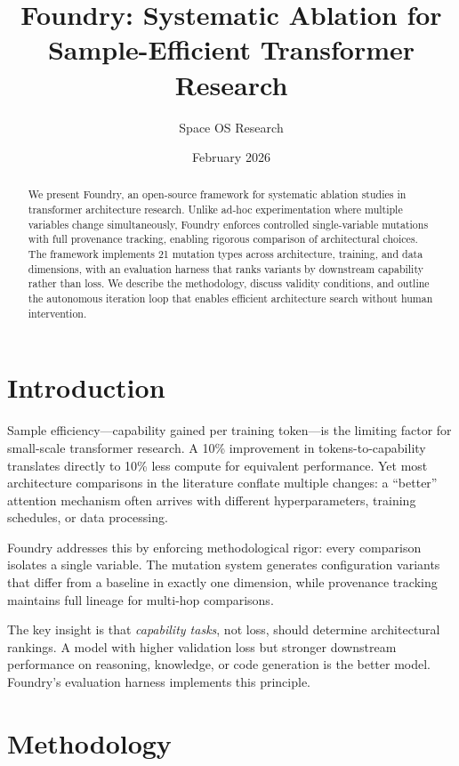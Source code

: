 \documentclass{article}
\title{Foundry: Systematic Ablation for Sample-Efficient Transformer Research}
\author{Space OS Research}
\date{February 2026}
\begin{document}
\maketitle

\begin{abstract}
We present Foundry, an open-source framework for systematic ablation studies in transformer architecture research. Unlike ad-hoc experimentation where multiple variables change simultaneously, Foundry enforces controlled single-variable mutations with full provenance tracking, enabling rigorous comparison of architectural choices. The framework implements 21 mutation types across architecture, training, and data dimensions, with an evaluation harness that ranks variants by downstream capability rather than loss. We describe the methodology, discuss validity conditions, and outline the autonomous iteration loop that enables efficient architecture search without human intervention.
\end{abstract}

\section{Introduction}

Sample efficiency---capability gained per training token---is the limiting factor for small-scale transformer research. A 10\% improvement in tokens-to-capability translates directly to 10\% less compute for equivalent performance. Yet most architecture comparisons in the literature conflate multiple changes: a ``better'' attention mechanism often arrives with different hyperparameters, training schedules, or data processing.

Foundry addresses this by enforcing methodological rigor: every comparison isolates a single variable. The mutation system generates configuration variants that differ from a baseline in exactly one dimension, while provenance tracking maintains full lineage for multi-hop comparisons.

The key insight is that \textit{capability tasks}, not loss, should determine architectural rankings. A model with higher validation loss but stronger downstream performance on reasoning, knowledge, or code generation is the better model. Foundry's evaluation harness implements this principle.

\section{Methodology}
\end{document}
